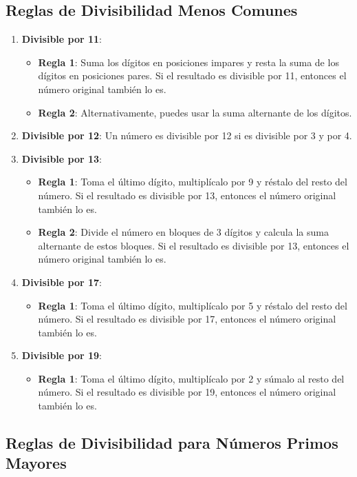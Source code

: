 \subsection{Reglas de Divisibilidad Menos Comunes}

\begin{enumerate}
	\item \textbf{Divisible por 11}:
	\begin{itemize}
		\item \textbf{Regla 1}: Suma los dígitos en posiciones impares y resta la suma de los dígitos en posiciones pares. Si el resultado es divisible por 11, entonces el número original también lo es.
		\item \textbf{Regla 2}: Alternativamente, puedes usar la suma alternante de los dígitos.
	\end{itemize}
	\item \textbf{Divisible por 12}: Un número es divisible por 12 si es divisible por 3 y por 4.
	\item \textbf{Divisible por 13}:
	\begin{itemize}
		\item \textbf{Regla 1}: Toma el último dígito, multiplícalo por 9 y réstalo del resto del número. Si el resultado es divisible por 13, entonces el número original también lo es.
		\item \textbf{Regla 2}: Divide el número en bloques de 3 dígitos y calcula la suma alternante de estos bloques. Si el resultado es divisible por 13, entonces el número original también lo es.
	\end{itemize}
	\item \textbf{Divisible por 17}:
	\begin{itemize}
		\item \textbf{Regla 1}: Toma el último dígito, multiplícalo por 5 y réstalo del resto del número. Si el resultado es divisible por 17, entonces el número original también lo es.
	\end{itemize}
	\item \textbf{Divisible por 19}:
	\begin{itemize}
		\item \textbf{Regla 1}: Toma el último dígito, multiplícalo por 2 y súmalo al resto del número. Si el resultado es divisible por 19, entonces el número original también lo es.
	\end{itemize}
\end{enumerate}

\subsection{Reglas de Divisibilidad para Números Primos Mayores}

